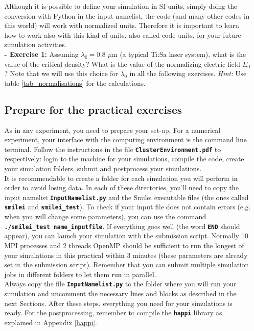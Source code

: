 \documentclass[a4paper,12pt]{extarticle}
\newcommand{\smilei}{{\sc Smilei}\xspace}
\newcommand{\commandline}[1]{\texttt{\textbf{#1}}}
\begin{document}
Although it is possible to define your simulation in SI units, simply doing the conversion with Python in the input namelist, the code (and many other codes in this world) will work with normalized units. Therefore it is important to learn how to work also with this kind of units, also called code units, for your future simulation activities. \\

\textbf{ - Exercise 1:} Assuming $\lambda_0=0.8$ $\mu$m (a typical Ti:Sa laser system), what is the value of the critical density? What is the value of the normalizing electric field $E_0$? Note that we will use this choice for $\lambda_0$ in all the following exercises. \textit{Hint:} Use table \ref{tab_normalisations} for the calculations.


\subsection{Prepare for the practical exercises}

As in any experiment, you need to prepare your set-up. For a numerical experiment, your interface with the computing environment is the command line terminal. Follow the instructions in the file \commandline{ClusterEnvironment.pdf} to respectively: login to the machine for your simulations, compile the code, create your simulation folders, submit and postprocess your simulations.\\

It is recommendable to create a folder for each simulation you will perform in order to avoid losing data. In each of these directories, you'll need to copy the input namelist \commandline{InputNamelist.py} and the \smilei executable files (the ones called \commandline{smilei} and \commandline{smilei\_test}). To check if your input file does not contain errors (e.g. when you will change some parameters), you can use the command \commandline{./smilei\_test name\_inputfile}. If everything goes well (the word \commandline{END} should appear), you can launch your simulation with the submission script. Normally 10 MPI processes and 2 threads OpenMP should be sufficient to run the longest of your simulations in this practical within 3 minutes (these parameters are already set in the submission script). Remember that you can submit multiple simulation jobs in different folders to let them run in parallel.\\

Always copy the file \commandline{InputNamelist.py} to the folder where you will run your simulation and uncomment the necessary lines and blocks as described in the next Sections.  After these steps, everything you need for your simulations is ready. For the postprocessing, remember to compile the \commandline{happi} library as explained in Appendix \ref{happi}.\\
\end{document}
